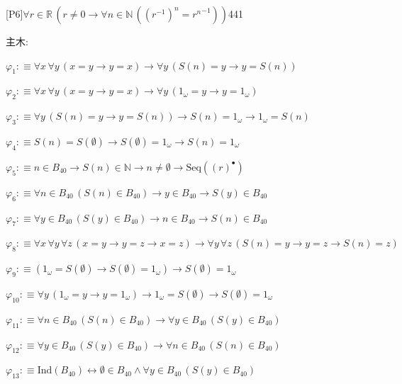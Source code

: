 \begin{fullproof}{[P6]}{$\forall r \in \mathbb{R}\,(r \neq 0 \to \forall n \in \mathbb{N}\,({{(r^{-1})}^{n}} = {{r}^{n}}^{-1}))$}{441}
\begin{ptree}
\end{ptree}
\noindent 主木:
\begin{ptree}
\noLine
{}
\end{ptree}
\begin{abbrevlist}
\item $\varphi_{1} :\equiv \forall x\,\forall y\,(x = y \to y = x) \to \forall y\,(S(n) = y \to y = S(n))$
\item $\varphi_{2} :\equiv \forall x\,\forall y\,(x = y \to y = x) \to \forall y\,(1_{\omega} = y \to y = 1_{\omega})$
\item $\varphi_{3} :\equiv \forall y\,(S(n) = y \to y = S(n)) \to S(n) = 1_{\omega} \to 1_{\omega} = S(n)$
\item $\varphi_{4} :\equiv S(n) = S(\emptyset) \to S(\emptyset) = 1_{\omega} \to S(n) = 1_{\omega}$
\item $\varphi_{5} :\equiv n \in B_{40} \to S(n) \in \mathbb{N} \to n \neq \emptyset \to \mathrm{Seq}({(r)^{\bullet}})$
\item $\varphi_{6} :\equiv \forall n \in B_{40}\,(S(n) \in B_{40}) \to y \in B_{40} \to S(y) \in B_{40}$
\item $\varphi_{7} :\equiv \forall y \in B_{40}\,(S(y) \in B_{40}) \to n \in B_{40} \to S(n) \in B_{40}$
\item $\varphi_{8} :\equiv \forall x\,\forall y\,\forall z\,(x = y \to y = z \to x = z) \to \forall y\,\forall z\,(S(n) = y \to y = z \to S(n) = z)$
\item $\varphi_{9} :\equiv (1_{\omega} = S(\emptyset) \to S(\emptyset) = 1_{\omega}) \to S(\emptyset) = 1_{\omega}$
\item $\varphi_{10} :\equiv \forall y\,(1_{\omega} = y \to y = 1_{\omega}) \to 1_{\omega} = S(\emptyset) \to S(\emptyset) = 1_{\omega}$
\item $\varphi_{11} :\equiv \forall n \in B_{40}\,(S(n) \in B_{40}) \to \forall y \in B_{40}\,(S(y) \in B_{40})$
\item $\varphi_{12} :\equiv \forall y \in B_{40}\,(S(y) \in B_{40}) \to \forall n \in B_{40}\,(S(n) \in B_{40})$
\item $\varphi_{13} :\equiv \mathrm{Ind}(B_{40}) \leftrightarrow \emptyset \in B_{40} \land \forall y \in B_{40}\,(S(y) \in B_{40})$

\end{abbrevlist}
\end{fullproof}
